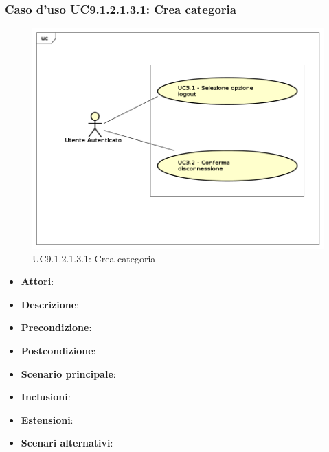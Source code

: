						\subsubsection{Caso d'uso UC9.1.2.1.3.1: Crea categoria}
						\label{UC9.1.2.1.3.1}
						\begin{figure}[h]
							\centering
						\includegraphics[scale=0.7,keepaspectratio]{UML/UC9.png}
							\caption{UC9.1.2.1.3.1: Crea categoria}
						\end{figure}
						\FloatBarrier
						\begin{itemize}
							\item \textbf{Attori}: 
							\item \textbf{Descrizione}: 
							\item \textbf{Precondizione}: 
							\item \textbf{Postcondizione}: 
							\item \textbf{Scenario principale}:
							\item \textbf{Inclusioni}:
							\item \textbf{Estensioni}:
							\item \textbf{Scenari alternativi}:
						\end{itemize}
						

